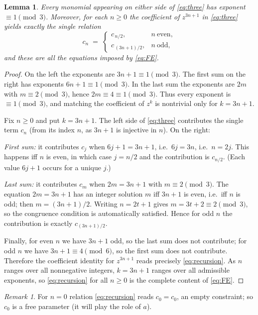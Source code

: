 \documentclass{amsart}
\newtheorem{lemma}{Lemma}
\theoremstyle{remark}
\newtheorem{remark}{Remark}
\begin{document}
\begin{lemma}\label{lem:exponents}
Every monomial appearing on either side of \eqref{eq:three} has exponent $\equiv 1\pmod 3$.
Moreover, for each $n\ge 0$ the coefficient of $z^{3n+1}$ in \eqref{eq:three} yields exactly the
single relation
\begin{equation}\label{eq:recursion}
c_n \;=\;
\begin{cases}
c_{\,n/2}, & n\ \text{even},\\[2pt]
c_{\,(3n+1)/2}, & n\ \text{odd},
\end{cases}
\end{equation}
and these are \emph{all} the equations imposed by \eqref{eq:FE}.
\end{lemma}
\begin{proof}
On the left the exponents are $3n+1\equiv1\pmod3$. The first sum on the right has exponents
$6n+1\equiv1\pmod3$. In the last sum the exponents are $2m$ with $m\equiv2\pmod3$, hence
$2m\equiv 4\equiv1\pmod 3$. Thus every exponent is $\equiv1\pmod3$, and matching the coefficient
of $z^{k}$ is nontrivial only for $k=3n+1$.

Fix $n\ge0$ and put $k=3n+1$. The left side of \eqref{eq:three} contributes the single term
$c_n$ (from its index $n$, as $3n+1$ is injective in $n$). On the right:

\emph{First sum:} it contributes $c_j$ when $6j+1=3n+1$, i.e.\ $6j=3n$, i.e.\ $n=2j$. This
happens iff $n$ is even, in which case $j=n/2$ and the contribution is $c_{n/2}$. (Each value
$6j+1$ occurs for a unique $j$.)

\emph{Last sum:} it contributes $c_m$ when $2m=3n+1$ with $m\equiv2\pmod3$. The equation
$2m=3n+1$ has an integer solution $m$ iff $3n+1$ is even, i.e.\ iff $n$ is odd; then
$m=(3n+1)/2$. Writing $n=2t+1$ gives $m=3t+2\equiv2\pmod3$, so the congruence condition is
automatically satisfied. Hence for odd $n$ the contribution is exactly $c_{(3n+1)/2}$.

Finally, for even $n$ we have $3n+1$ odd, so the last sum does not contribute; for odd $n$ we
have $3n+1\equiv 4\pmod 6$, so the first sum does not contribute. Therefore the coefficient
identity for $z^{3n+1}$ reads precisely \eqref{eq:recursion}. As $n$ ranges over all
nonnegative integers, $k=3n+1$ ranges over all admissible exponents, so \eqref{eq:recursion}
for all $n\ge0$ is the complete content of \eqref{eq:FE}.
\end{proof}

\begin{remark}
For $n=0$ relation \eqref{eq:recursion} reads $c_0=c_0$, an empty constraint; so $c_0$ is a free
parameter (it will play the role of $a$).
\end{remark}
\end{document}
